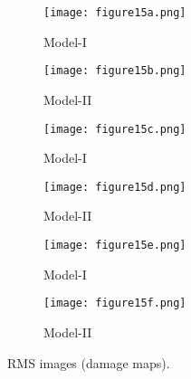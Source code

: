 \begin{sloppypar}
	\begin{figure} [!ht]
		\begin{subfigure}[b]{.48\textwidth}
			\centering
			\texttt{[image: figure15a.png]}
			\caption{Model-I}
			\label{fig:RMS_L3_S4_B_saeed}
		\end{subfigure}
		\hfill
		\begin{subfigure}[b]{.48\textwidth}
			\centering
			\texttt{[image: figure15b.png]}
			\caption{Model-II} 
			\label{fig:RMS_L3_S2_B_ijjeh}
		\end{subfigure}
		\hfill
		\begin{subfigure}[b]{.48\textwidth}
			\centering
			\texttt{[image: figure15c.png]}
			\caption{Model-I}
			\label{fig:RMS_L3_S2_B_saeed}
		\end{subfigure}
		\hfill
		\begin{subfigure}[b]{.48\textwidth}
			\centering
			\texttt{[image: figure15d.png]}
			\caption{Model-II} 
			\label{fig:RMS_L3_S3_B_ijjeh}
		\end{subfigure}
		\hfill
		\begin{subfigure}[b]{.48\textwidth}
			\centering
			\texttt{[image: figure15e.png]}
			\caption{Model-I}
			\label{fig:RMS_L3_S3_B_saeed}
		\end{subfigure}
		\hfill
		\begin{subfigure}[b]{.48\textwidth}
			\centering
			\texttt{[image: figure15f.png]}
			\caption{Model-II} 
			\label{fig:RMS_L3_S4_B_ijjeh}
		\end{subfigure}
		\caption{RMS images (damage maps).}
		\label{fig:RMS_L3_S_B__images}
	\end{figure} 
	

\end{sloppypar}
